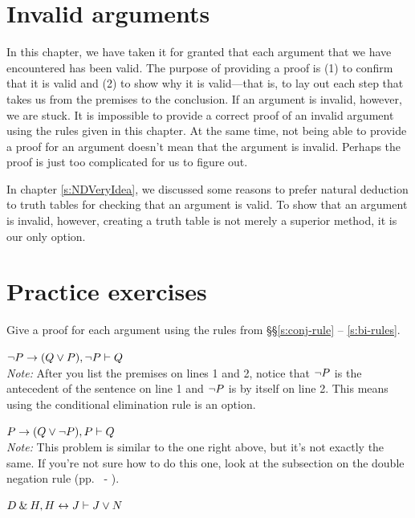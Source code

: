 {{{{{{{{{\begin{earg}
\end{earg}



\section{Invalid arguments}

In this chapter, we have taken it for granted that each argument that we have encountered has been valid. The purpose of providing a proof is (1) to confirm that it is valid and (2) to show why it is valid---that is, to lay out each step that takes us from the premises to the conclusion. If an argument is invalid, however, we are stuck. It is impossible to provide a correct proof of an invalid argument using the rules given in this chapter. At the same time, not being able to provide a proof for an argument doesn't mean that the argument is invalid. Perhaps the proof is just too complicated for us to figure out. 

In chapter \ref{s:NDVeryIdea}, we discussed some reasons to prefer natural deduction to truth tables for checking that an argument is valid. To show that an argument is invalid, however, creating a truth table is not merely a superior method, it is our only option.



\section{Practice exercises}
\setcounter{ProbPart}{0}

\begin{small}

\problempart\label{practice-proofs-1}
Give a proof for each argument using the rules from \S\S \ref{s:conj-rule} -- \ref{s:bi-rules}.
\begin{earg}
\item ${\neg} P \rightarrow (Q \vee P), {\neg} P \vdash Q$\\
\textit{Note:} After you list the premises on lines 1 and 2, notice that ${\neg} P$ is the antecedent of the sentence on line 1 and ${\neg} P$ is by itself on line 2. This means using the conditional elimination rule is an option.
\medskip
\item $P \rightarrow (Q \vee {\neg} P), P \vdash Q$\\
\textit{Note:} This problem is similar to the one right above, but it's not exactly the same. If you're not sure how to do this one, look at the subsection on the double negation rule (pp.~\pageref{subsection-DN} - \pageref{DN-box}).
\medskip
\item $D \mathbin{\&} H, H \leftrightarrow J  \vdash J \vee N$\smallskip 


\end{earg}
\end{small}}}}}}}}}}
